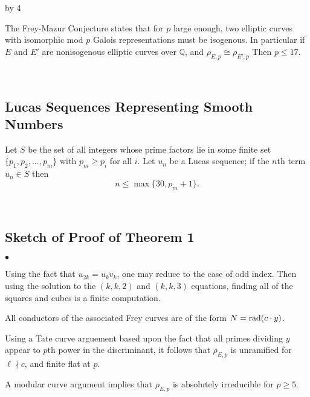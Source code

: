 \documentclass[12pt]{scrartcl}
\newenvironment{citemize}{
\begin{list}{$\bullet$}{\setlength{\itemsep}{0pt} \setlength{\rightmargin}{0pt} \setlength{\leftmargin}{0.5\labelwidth} \setlength{\topsep}{0pt}}
}{\end{list}}
\def\Q{{\mathbb Q}}
\newcommand{\rad}{{\rm{rad}}}
\newcommand{\notdiv}{\nmid}
\def\anzspalten{4}
\newlength{\kastenwidth}
\newenvironment{kasten}{%
  \begin{lrbox}{\dummybox}%
    \begin{minipage}{0.96\linewidth}}%
    {\end{minipage}%
  \end{lrbox}%
  \raisebox{-\depth}{\psshadowbox[framesep=1em]{\usebox{\dummybox}}}\\[0.5em]}
\newenvironment{spalte}{%
  \setlength\kastenwidth{1.2\textwidth}
  \divide\kastenwidth by \anzspalten
  \begin{minipage}[t]{\kastenwidth}}{\end{minipage}\hfill}
\begin{document}
\begin{lrbox}{\spalten}
{\begin{spalte}
\begin{kasten}
The Frey-Mazur Conjecture states that for $p$ large enough, two elliptic curves with isomorphic mod $p$ Galois representations must be isogenous. In particular if $E$ and $E'$ are nonisogenous elliptic curves over $\Q$, and $\rho_{E,p} \cong \rho_{E',p}$
Then $p\leq 17$.


\end{kasten}

\begin{kasten}

\subsection*{ \color{blue} Lucas Sequences Representing Smooth Numbers}

Let $S$ be the set of all integers whose prime factors lie in some finite set $\{p_1,p_2,...,p_m\}$ with $p_m \geq p_i$ for all $i$.  Let $u_n$ be a Lucas sequence; if the $n$th term $u_n \in S$ then
\[ n \leq \max\{30, p_m +1 \}. \]

\end{kasten}


\begin{kasten}

\subsection*{\color{blue} Sketch of Proof of Theorem 1}

\begin{citemize}

\item Using the fact that $u_{2k} = u_kv_k$, one may reduce to the case of odd index.  Then using the solution to the $(k,k,2)$ and $(k,k, 3)$ equations, finding all of the squares and cubes is a finite computation.

\item All conductors of the associated Frey curves are of the form $N = \rad(c \cdot y)$.

\item Using a Tate curve arguement based upon the fact that all primes dividing $y$ appear to $p$th power in the discriminant, it follows that $\rho_{E,p}$ is unramified for $\ell \notdiv c$, and finite flat at $p$.

\item A modular curve argument implies that $\rho_{E,p}$ is absolutely irreducible for $p \geq 5$.


\end{citemize}
\end{kasten}
\end{spalte}}
\end{lrbox}
\end{document}

